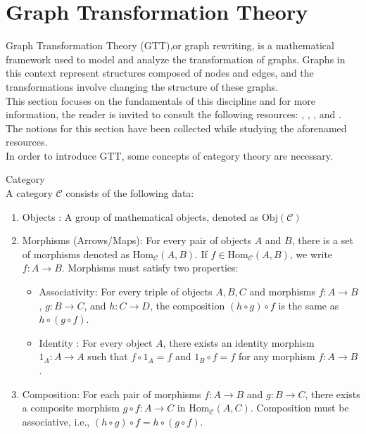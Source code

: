 \section{Graph Transformation Theory}
Graph Transformation Theory (GTT),or graph rewriting, is a mathematical framework used to model and analyze the transformation of graphs. Graphs in this context represent structures composed of nodes and edges, and the transformations involve changing the structure of these graphs.\\
This section focuses on the fundamentals of this discipline and for more information, the reader is invited to consult the following resources: \cite{HECKEL2006187}, \cite{handbook_of_gg}, \cite{essential_on_graph_theory}, \cite{2123-19534} and \cite{gtt_se}. The notions for this section have been collected while studying the aforenamed resources. \\
In order to introduce GTT, some concepts of category theory are necessary. \\

\begin{definition}{Category}\\
A category $\mathcal{C}$ consists of the following data:
\begin{enumerate}
	\item Objects : A group of mathematical objects, denoted as $\text{Obj}(\mathcal{C})$
	\item Morphisms (Arrows/Maps): For every pair of objects $A$ and $B$, there is a set of morphisms denoted as $\text{Hom}_{\mathcal{C}}(A, B)$. If $f \in \text{Hom}_{\mathcal{C}}(A, B)$, we write $f: A \to B$. Morphisms must satisfy two properties:
	\begin{itemize}
		\item  Associativity: For every triple of objects $A, B, C$ and morphisms $f: A \to B$, $g: B \to C$, and $h: C \to D$, the composition $(h \circ g) \circ f$ is the same as $h \circ (g \circ f)$.
		\item Identity : For every object $A$, there exists an identity morphism $1_A: A \to A$ such that $f \circ 1_A = f$ and $1_B \circ f = f$ for any morphism $f: A \to B$.
	\end{itemize}
	\item Composition: For each pair of morphisms $f: A \to B$ and $g: B \to C$, there exists a composite morphism $g \circ f: A \to C$ in $\text{Hom}_{\mathcal{C}}(A, C)$. Composition must be associative, i.e., $(h \circ g) \circ f = h \circ (g \circ f)$.
\end{enumerate}
\end{definition}




